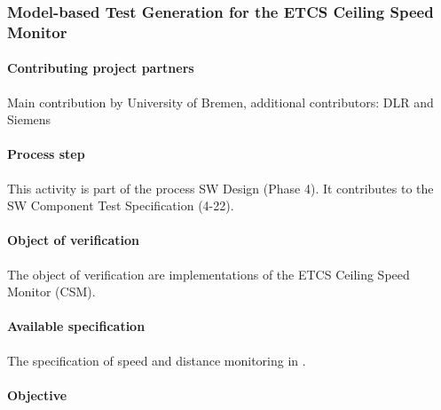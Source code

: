
\subsubsection{Model-based Test Generation for the ETCS Ceiling Speed Monitor}
\label{sec:csmunibremen}

\paragraph{Contributing project partners}
Main contribution by University of Bremen, additional contributors: DLR and Siemens 

\paragraph{Process step}
This activity is part of the process SW Design (Phase 4). It
contributes to the SW Component Test
Specification (4-22). 

\paragraph{Object of verification}
The object of verification are implementations of the ETCS
Ceiling Speed Monitor (CSM).  


\paragraph{Available specification}

The specification of speed and distance monitoring in \cite[Sec.~3.13]{subset-026:3.3.0}.

\paragraph{Objective}

